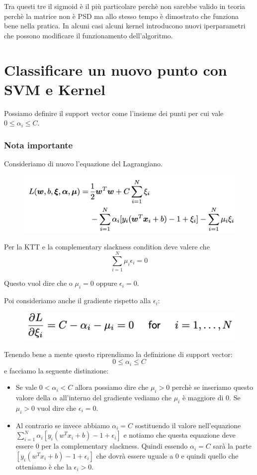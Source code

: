 \documentclass[14pt]{extreport}
\begin{document}
Tra questi tre il sigmoid è il più particolare perchè non sarebbe valido in teoria perchè la matrice non è PSD ma allo stesso tempo è dimostrato che
funziona bene nella pratica. In alcuni casi alcuni kernel introducono nuovi iperparametri che possono modificare il funzionamento dell'algoritmo.

\section{Classificare un nuovo punto con SVM e Kernel}

Possiamo definire il support vector come l'insieme dei punti per cui vale $0 \leq \alpha_i \leq C$.

\subsubsection{Nota importante}

Consideriamo di nuovo l'equazione del Lagrangiano.
\begin{figure}[H]
	\centering
	\includegraphics[width=0.7\linewidth]{350.jpeg}
\end{figure}

Per la KTT e la complementary slackness condition deve valere che $$\sum_{i=1}^N \mu_i \epsilon_i = 0$$

Questo vuol dire che o $\mu_i = 0$ oppure $\epsilon_i=0$.

Poi consideriamo anche il gradiente rispetto alla $\epsilon_i$:

\begin{figure}[H]
	\centering
	\includegraphics[width=0.7\linewidth]{351.jpeg}
\end{figure}

Tenendo bene a mente questo riprendiamo la definizione di support vector: $$0 \leq \alpha_i \leq C$$ e facciamo la seguente distinzione:
\begin{itemize}
	\item Se vale $0 < \alpha_i < C$ allora possiamo dire che $\mu_i > 0$ perchè se inseriamo questo valore della $\alpha$ all'interno del gradiente
	      vediamo che $\mu_i$ è maggiore di 0. Se $\mu_i > 0$ vuol dire che $\epsilon_i = 0$.
	\item Al contrario se invece abbiamo $\alpha_i = C$ sostituendo il valore nell'equazione $\sum_{i=1}^N \alpha_i[y_i(w^Tx_i+b)-1+\epsilon_i]$ e
	      notiamo che questa equazione deve essere 0 per la complementary slackness. Quindi essendo $\alpha_i = C$ sarà la parte
	      $[y_i(w^Tx_i+b)-1+\epsilon_i]$ che dovrà essere uguale a 0 e quindi quello che otteniamo è che la $\epsilon_i > 0$.
\end{itemize}
\end{document}
